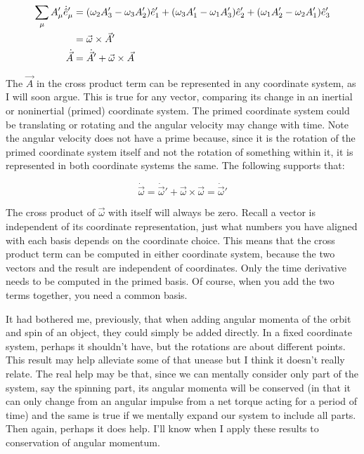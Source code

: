 \documentclass[10pt]{article}
\begin{document}
\begin{align}
    \sum_\mu A'_\mu\dot{\hat{e}}'_\mu &= 
        (\omega_2 A'_3 - \omega_3 A'_2)\hat{e}'_1 + 
        (\omega_3 A'_1 - \omega_1 A'_3)\hat{e}'_2 + 
        (\omega_1 A'_2 - \omega_2 A'_1)\hat{e}'_3 \notag\\
    &= \vec{\omega}\times\vec{A}' \notag\\
    \dot{\vec{A}} &= \dot{\vec{A}}' + \vec{\omega}\times\vec{A}
\end{align}

The $\vec{A}$ in the cross product term can be represented in any coordinate 
system, as I will soon argue. 
This is true for any vector, comparing its change in an inertial or 
noninertial (primed) coordinate system. The primed coordinate system 
could be translating or rotating and the angular velocity may change with 
time. Note the angular velocity does not have a prime because, since it is 
the rotation of the primed coordinate system itself and 
not the rotation of something within it, 
it is represented in both coordinate systems the same. The following 
supports that:

\begin{equation}
    \dot{\vec{\omega}} = \dot{\vec{\omega}}' + \vec{\omega}\times\vec{\omega} =
        \dot{\vec{\omega}}'
\end{equation}

The cross product of $\vec{\omega}$ with itself will always be zero. 
Recall a vector is independent of its coordinate representation, just what 
numbers you have aligned with each basis depends on the coordinate choice. This 
means that the cross product term can be computed in either coordinate system, 
because the two vectors and the result are independent of coordinates. Only 
the time derivative needs to be computed in the primed basis. Of course, 
when you add the two terms together, you need a common basis.

It had bothered me, previously, that when adding angular momenta of the 
orbit and spin of an object, they could simply be added directly. In a fixed 
coordinate system, perhaps it shouldn't have, but the rotations are about 
different points. This result may help alleviate some of that unease but 
I think it doesn't really relate. The real help may be that, since we can 
mentally consider only part of the system, say the spinning part, its angular 
momenta will be conserved (in that it can only change from an angular impulse 
from a net torque acting for a period of time) and the same is true if we 
mentally expand our system to include all parts. Then again, perhaps it 
does help. I'll know when I apply these results to conservation of angular 
momentum.
\end{document}
